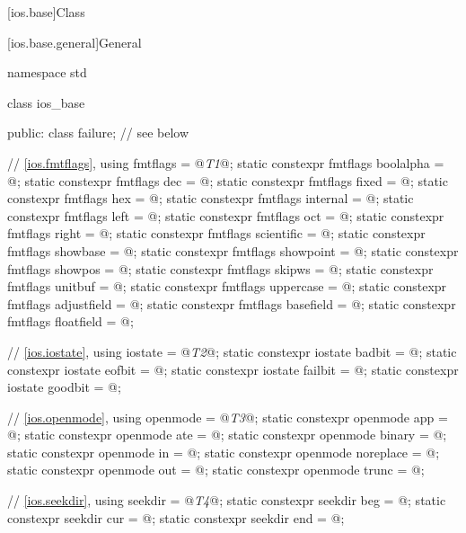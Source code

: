 %
%
%
%
%

[ios.base]{Class }

[ios.base.general]{General}
%
\begin{codeblock}
namespace std {
  class ios_base {
  public:
    class failure;              // see below

    // \ref{ios.fmtflags}, 
    using fmtflags = @\textit{T1}@;
    static constexpr fmtflags boolalpha = @\unspec@;
    static constexpr fmtflags dec = @\unspec@;
    static constexpr fmtflags fixed = @\unspec@;
    static constexpr fmtflags hex = @\unspec@;
    static constexpr fmtflags internal = @\unspec@;
    static constexpr fmtflags left = @\unspec@;
    static constexpr fmtflags oct = @\unspec@;
    static constexpr fmtflags right = @\unspec@;
    static constexpr fmtflags scientific = @\unspec@;
    static constexpr fmtflags showbase = @\unspec@;
    static constexpr fmtflags showpoint = @\unspec@;
    static constexpr fmtflags showpos = @\unspec@;
    static constexpr fmtflags skipws = @\unspec@;
    static constexpr fmtflags unitbuf = @\unspec@;
    static constexpr fmtflags uppercase = @\unspec@;
    static constexpr fmtflags adjustfield = @\seebelow@;
    static constexpr fmtflags basefield = @\seebelow@;
    static constexpr fmtflags floatfield = @\seebelow@;

    // \ref{ios.iostate}, 
    using iostate = @\textit{T2}@;
    static constexpr iostate badbit = @\unspec@;
    static constexpr iostate eofbit = @\unspec@;
    static constexpr iostate failbit = @\unspec@;
    static constexpr iostate goodbit = @\seebelow@;

    // \ref{ios.openmode}, 
    using openmode = @\textit{T3}@;
    static constexpr openmode app = @\unspec@;
    static constexpr openmode ate = @\unspec@;
    static constexpr openmode binary = @\unspec@;
    static constexpr openmode in = @\unspec@;
    static constexpr openmode noreplace = @\unspec@;
    static constexpr openmode out = @\unspec@;
    static constexpr openmode trunc = @\unspec@;

    // \ref{ios.seekdir}, 
    using seekdir = @\textit{T4}@;
    static constexpr seekdir beg = @\unspec@;
    static constexpr seekdir cur = @\unspec@;
    static constexpr seekdir end = @\unspec@;

}}
\end{codeblock}
